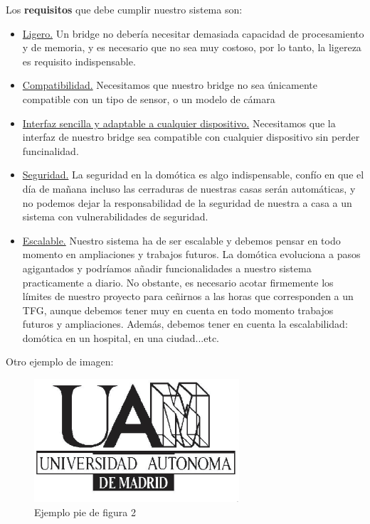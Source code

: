 Los \textbf{requisitos} que debe cumplir nuestro sistema son:
\begin{itemize}
  \item \underline{Ligero.} Un bridge no debería necesitar demasiada capacidad de procesamiento y de memoria, y es necesario que no sea muy costoso, por lo tanto, la ligereza es requisito indispensable.
  \item \underline{Compatibilidad.} Necesitamos que nuestro bridge no sea únicamente compatible con un tipo de sensor, o un modelo de cámara
  \item \underline{Interfaz sencilla y adaptable a cualquier dispositivo.} Necesitamos que la interfaz de nuestro bridge sea compatible con cualquier dispositivo sin perder funcinalidad.
  \item \underline{Seguridad.} La seguridad en la domótica es algo indispensable, confío en que el día de mañana incluso las cerraduras de nuestras casas serán automáticas, y no podemos dejar la responsabilidad de la seguridad
  de nuestra a casa a un sistema con vulnerabilidades de seguridad.
  \item \underline{Escalable.} Nuestro sistema ha de ser escalable y debemos pensar en todo momento en ampliaciones y trabajos futuros. La domótica evoluciona a pasos agigantados y podríamos añadir funcionalidades a nuestro 
  sistema practicamente a diario. No obstante, es necesario acotar firmemente los límites de nuestro proyecto para ceñirnos a las horas que corresponden a un TFG, aunque debemos tener muy en cuenta en todo momento trabajos futuros y ampliaciones.
  Además, debemos tener en cuenta la escalabilidad: domótica en un hospital, en una ciudad...etc.
\end{itemize}


Otro ejemplo de imagen:
\begin{figure}[h]
  \centerline{
    \mbox{\includegraphics[width=3.00in]{images/logo_uam.eps}}
  }
  \caption{Ejemplo pie de figura 2}
  \label{fig:norm_Daugman}
\end{figure}

\newpage \thispagestyle{empty} %